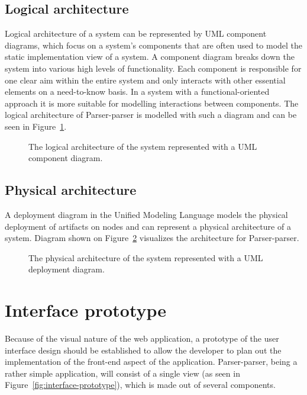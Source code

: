 \documentclass[english,bachelors,forcepolishlogotype]{wizthesis}
\newcommand{\paraphrase}[1]{#1}
\newcommand{\thisproject}{Parser-parser}
\begin{document}
\subsection{Logical architecture}

Logical architecture of a system can be represented by UML component diagrams,
which focus on a system's components that are often used to model the static
implementation view of a system. \paraphrase{A component diagram breaks down the
system into various high levels of functionality. Each component is responsible
for one clear aim within the entire system and only interacts with other
essential elements on a need-to-know basis.} In a system with a
functional-oriented approach it is more suitable for modelling interactions
between components. The logical architecture of \thisproject{} is modelled with
such a diagram and can be seen in Figure~\ref{fig:logical-architecture}.

\begin{figure}[H]
  \centering
  \resizebox{0.8\textwidth}{!}{\small}
  \caption{The logical architecture of the system represented with a UML
  component diagram.}
  \label{fig:logical-architecture}
\end{figure}

\subsection{Physical architecture}

A deployment diagram in the Unified Modeling Language models the physical
deployment of artifacts on nodes and can represent a physical architecture of
a system. Diagram shown on Figure~\ref{fig:physical-architecture} visualizes
the architecture for \thisproject{}.

\begin{figure}[H]
  \centering
  \resizebox{\textwidth}{!}{\footnotesize}
  \caption{The physical architecture of the system represented with a UML
  deployment diagram.}
  \label{fig:physical-architecture}
\end{figure}

\section{Interface prototype} \label{sec:interface-prototype}

Because of the visual nature of the web application, a prototype of the user
interface design should be established to allow the developer to plan out the
implementation of the front-end aspect of the application. \thisproject{}, being
a rather simple application, will consist of a single view (as seen in
Figure~\ref{fig:interface-prototype}), which is made out of several components.
\end{document}
